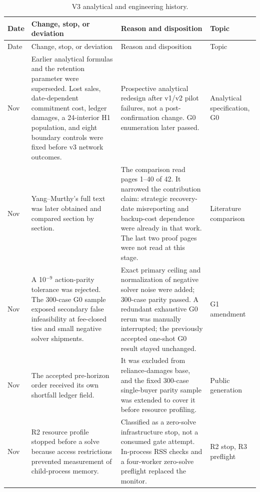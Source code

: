\documentclass[preprint,11pt,authoryear]{elsarticle}
\begin{document}
\begingroup\small\setlength{\tabcolsep}{4pt}\renewcommand{\arraystretch}{1.18}
\renewcommand{\thetable}{C3}
\begin{longtable}{>{\raggedright\arraybackslash}p{1.1cm}>{\raggedright\arraybackslash}p{4.6cm}>{\raggedright\arraybackslash}p{6.2cm}>{\raggedright\arraybackslash}p{2.7cm}}
\caption{V3 analytical and engineering history.}\label{tab:deviations3}\\
\toprule
Date & Change, stop, or deviation & Reason and disposition & Topic \\
\midrule
\endfirsthead
Date & Change, stop, or deviation & Reason and disposition & Topic \\
\midrule
\endhead
\bottomrule\endfoot
12 Nov & Earlier analytical formulas and the retention parameter were superseded. Lost sales, date-dependent commitment cost, ledger damages, a 24-interior H1 population, and eight boundary controls were fixed before v3 network outcomes. & Prospective analytical redesign after v1/v2 pilot failures, not a post-confirmation change. G0 enumeration later passed. & Analytical specification, G0 \\
12 Nov & Yang--Murthy's full text was later obtained and compared section by section. & The comparison read pages 1--40 of 42. It narrowed the contribution claim: strategic recovery-date misreporting and backup-cost dependence were already in that work. The last two proof pages were not read at this stage. & Literature comparison \\
12 Nov & A 10$^{-9}$ action-parity tolerance was rejected. The 300-case G0 sample exposed secondary false infeasibility at fee-closed ties and small negative solver shipments. & Exact primary ceiling and normalization of negative solver noise were added; 300-case parity passed. A redundant exhaustive G0 rerun was manually interrupted; the previously accepted one-shot G0 result stayed unchanged. & G1 amendment \\
12 Nov & The accepted pre-horizon order received its own shortfall ledger field. & It was excluded from reliance-damages base, and the fixed 300-case single-buyer parity sample was extended to cover it before resource profiling. & Public generation \\
12 Nov & R2 resource profile stopped before a solve because access restrictions prevented measurement of child-process memory. & Classified as a zero-solve infrastructure stop, not a consumed gate attempt. In-process RSS checks and a four-worker zero-solve preflight replaced the monitor. & R2 stop, R3 preflight \\

\end{longtable}
\end{document}
